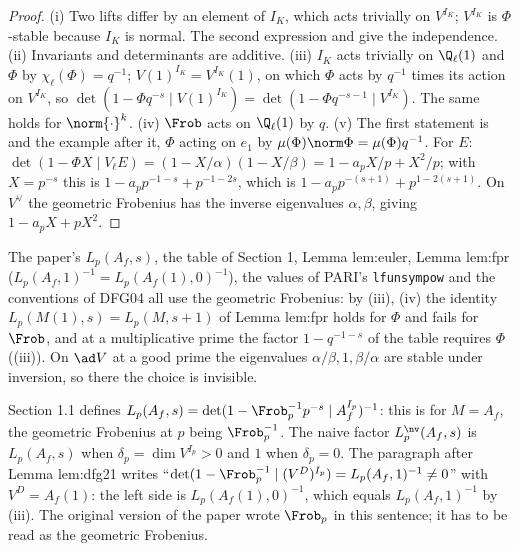 \begin{proof}
(i) Two lifts differ by an element of $I_K$, which acts trivially on $V^{I_K}$; $V^{I_K}$ is $\Phi$-stable because $I_K$ is normal. The second expression and
 give the independence. (ii) Invariants and determinants are additive. (iii) $I_K$ acts trivially on $\Q_\ell(1)$ and $\Phi$ by
$\chi_\ell(\Phi)=q^{-1}$; $V(1)^{I_K}=V^{I_K}(1)$, on which $\Phi$ acts by $q^{-1}$ times its action on $V^{I_K}$, so $\det(1-\Phi q^{-s}\mid V(1)^{I_K})=\det(1-\Phi q^{-s-1}\mid V^{I_K})$.
The same holds for $\norm{\cdot}^k$. (iv) $\Frob$ acts on $\Q_\ell(1)$ by $q$. (v) The first statement is  and the example after it,
$\Phi$ acting on $e_1$ by $\mu(\Phi)\norm\Phi=\mu(\Phi)q^{-1}$. For $E$: $\det(1-\Phi X\mid V_\ell E)=(1-X/\alpha)(1-X/\beta)=1-a_pX/p+X^2/p$; with $X=p^{-s}$ this is
$1-a_pp^{-1-s}+p^{-1-2s}$, which is $1-a_pp^{-(s+1)}+p^{1-2(s+1)}$. On $V^\vee$ the geometric Frobenius has the inverse eigenvalues $\alpha,\beta$, giving
$1-a_pX+pX^2$.
\end{proof}

\begin{warning}\label{warn:local:geometric}
The paper's $L_p(A_f,s)$, the table of Section 1, Lemma lem:euler, Lemma lem:fpr ($L_p(A_f,1)^{-1}=L_p(A_f(1),0)^{-1}$), the values of PARI's
\texttt{lfunsympow} and the conventions of DFG04 \cite[Section 1.7.2]{DFG04} all use the geometric Frobenius: by (iii), (iv) the identity
$L_p(M(1),s)=L_p(M,s+1)$ of Lemma lem:fpr holds for $\Phi$ and fails for $\Frob$, and at a multiplicative prime the factor $1-q^{-1-s}$ of the table
requires $\Phi$ ((iii)). On $\ad V$ at a good prime the eigenvalues $\alpha/\beta,1,\beta/\alpha$ are stable under inversion, so there
the choice is invisible.
\end{warning}

\begin{paperlink}\label{pl:local:Lfactor}
Section 1.1 defines $L_p(A_f,s)=\det(1-\Frob_p^{-1}p^{-s}\mid A_f^{I_p})^{-1}$: this is  for $M=A_f$, the geometric Frobenius
at $p$ being $\Frob_p^{-1}$. The naive factor
$L_p^{\nv}(A_f,s)$ is $L_p(A_f,s)$ when $\delta_p=\dim V^{I_p}>0$ and $1$ when $\delta_p=0$. The paragraph after Lemma lem:dfg21 writes
``$\det(1-\Frob_p^{-1}\mid(V^D)^{I_p})=L_p(A_f,1)^{-1}\ne0$'' with $V^D=A_f(1)$: the left side is $L_p(A_f(1),0)^{-1}$, which equals $L_p(A_f,1)^{-1}$ by
(iii). The original version of the paper wrote $\Frob_p$ in this sentence; it has to be read as the geometric Frobenius.
\end{paperlink}

